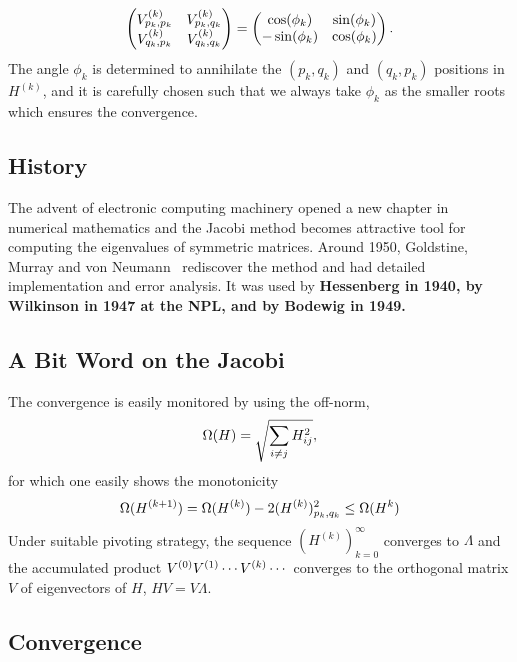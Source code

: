 \documentclass{article}
\begin{document}
\begin{equation}\notag
  \begin{pmatrix}
    V_{p_k,p_k}^{(k)} & V_{p_k,q_k}^{(k)} \\
    V_{q_k,p_k}^{(k)} & V_{q_k,q_k}^{(k)} 
  \end{pmatrix} =
  \begin{pmatrix}
    \cos(\phi_k) & \sin(\phi_k) \\ -\sin(\phi_k) & \cos(\phi_k) 
  \end{pmatrix}. 
\end{equation}
The angle $\phi_k$ is determined to annihilate the $(p_k,q_k)$ and
$(q_k,p_k)$ positions in $H^{(k)}$, and it is carefully chosen such that we
always take $\phi_k$ as the smaller roots which ensures the convergence.

\subsection{History}
The advent of electronic computing machinery opened a new chapter in
numerical mathematics and the Jacobi method becomes attractive tool for
computing the eigenvalues of symmetric matrices. Around 1950, Goldstine,
Murray and von Neumann~\cite{gmv59} rediscover the method and had detailed
implementation and error analysis. It was used by \bf{Hessenberg} in 1940,
by \bf{Wilkinson} in 1947 at the NPL, and by \bf{Bodewig} in 1949.

\subsection{A Bit Word on the Jacobi}
The convergence is easily monitored by using the off-norm,
\begin{equation}\notag
  \Omega(H) = \sqrt{\sum_{i\neq j} H^2_{ij}},
\end{equation}
for which one easily shows the monotonicity 
\begin{equation}\notag
  \Omega(H^{(k+1)}) = \Omega(H^{(k)})-2(H^{(k)})^{2}_{p_k,q_k}\leq \Omega(H^k)
\end{equation}
Under suitable pivoting strategy, the sequence $(H^{(k)})_{k = 0}^{\infty}$
converges to $\Lambda$ and the accumulated product
$V^{(0)}V^{(1)}\cdots V^{(k)}\cdots$ converges to the orthogonal
matrix $V$ of eigenvectors of $H$, $HV = V\Lambda$. 

\subsection{Convergence} 
\end{document}
